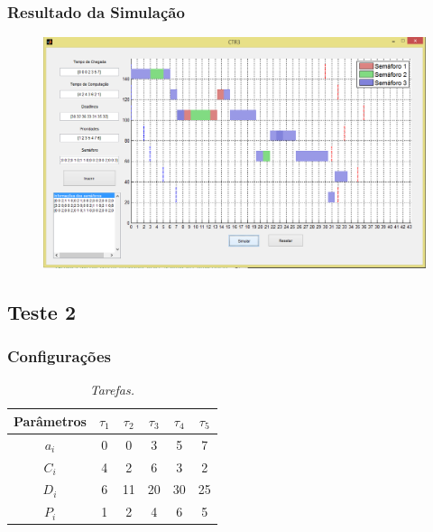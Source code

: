 \subsubsection{Resultado da Simulação}

\begin{figure}[H]
	\centering
	\includegraphics[keepaspectratio,width=1\textwidth]{img/teste1.png}
\end{figure}



\subsection{Teste 2}
\subsubsection{Configurações}
\begin{table}[H]
\centering
\caption{\em Tarefas.}
\vspace{0.1cm}
\begin{tabular}{c||c|c|c|c|c}
 
Parâmetros & $\tau_1$ & $\tau_2$ & $\tau_3$ & $\tau_4$ & $\tau_5$\\ 
\hline 
                          
$a_i$ & 0 & 0 & 3 & 5 & 7\\ 
$C_i$ & 4 & 2 & 6 & 3 & 2\\ 
$D_i$ & 6 & 11 & 20 & 30 & 25\\
$P_i$ & 1 & 2 & 4 & 6 & 5
 
\end{tabular}
\end{table}

